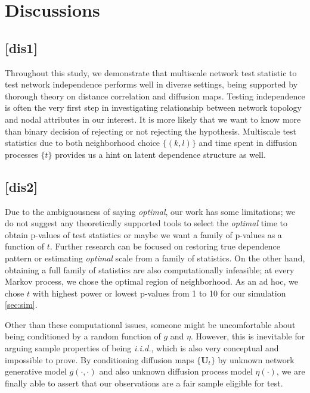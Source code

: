 \documentclass[12pt]{article}
\theoremstyle{definition}
\begin{document}
\newpage
\section{Discussions}
\label{sec:discussion}



\subsection{[dis1]}


Throughout this study, we demonstrate that multiscale network test statistic to test network independence performs well in diverse settings, being supported by thorough theory on distance correlation and diffusion maps. 
Testing independence is often the very first step in investigating relationship between network topology and nodal attributes in our interest. It is more likely that we want to know more than binary decision of rejecting or not rejecting the hypothesis. Multiscale test statistics due to both neighborhood choice $\{ (k,l)  \}$ and time spent in diffusion processes $\{ t \}$ provides us a hint on latent dependence structure as well.  


\subsection{[dis2]}

	Due to the ambiguousness of saying \textit{optimal}, our work has some limitations; we do not suggest any theoretically supported tools to select the \textit{optimal} time to obtain p-values of test statistics or maybe we want a family of p-values as a function of $t$. Further research can be focused on restoring true dependence pattern or estimating \textit{optimal} scale from a family of statistics. On the other hand, obtaining a full family of statistics are also computationally infeasible; at every Markov process, we chose the optimal region of neighborhood. As an ad hoc, we chose $t$ with highest power or lowest p-values from 1 to 10 for our simulation \ref{sec:sim}.  
	
	Other than these computational issues, someone might be uncomfortable about being conditioned by a random function of $g$ and $\eta$.  However, this is inevitable for arguing sample properties of being \textit{i.i.d.}, which is also very conceptual and impossible to prove. By conditioning diffusion maps $\{ \mathbf{U}_{t} \}$ by unknown network generative model $g(\cdot, \cdot)$ and also unknown diffusion process model $\eta(\cdot)$, we are finally able to assert that our observations are a fair sample eligible for test. 
	
\end{document}
